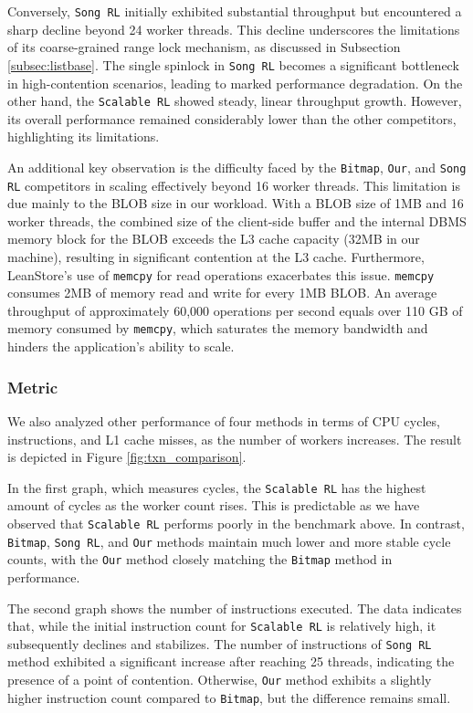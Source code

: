 Conversely, \texttt{Song RL} initially exhibited substantial throughput but encountered a sharp decline beyond 24 worker threads. 
This decline underscores the limitations of its coarse-grained range lock mechanism, as discussed in Subsection \ref{subsec:listbase}. 
The single spinlock in \texttt{Song RL} becomes a significant bottleneck in high-contention scenarios, leading to marked performance degradation. 
On the other hand, the \texttt{Scalable RL} showed steady, linear throughput growth. 
However, its overall performance remained considerably lower than the other competitors, highlighting its limitations.

An additional key observation is the difficulty faced by the \texttt{Bitmap}, \texttt{Our}, and \texttt{Song RL} competitors in scaling effectively beyond 16 worker threads. 
This limitation is due mainly to the BLOB size in our workload. With a BLOB size of 1MB and 16 worker threads, the combined size of the client-side buffer and the internal DBMS memory block for the BLOB exceeds the L3 cache capacity (32MB in our machine), resulting in significant contention at the L3 cache. 
Furthermore, LeanStore's use of \texttt{memcpy} for read operations exacerbates this issue. \texttt{memcpy} consumes 2MB of memory read and write for every 1MB BLOB. 
An average throughput of approximately 60,000 operations per second equals over 110 GB of memory consumed by \texttt{memcpy}, which saturates the memory bandwidth and hinders the application's ability to scale.

\subsubsection*{Metric}


We also analyzed other performance of four methods in terms of CPU cycles, instructions, and L1 cache misses, as the number of workers increases. The result is depicted in Figure \ref{fig:txn_comparison}. 

In the first graph, which measures cycles, the \texttt{Scalable RL} has the highest amount of cycles as the worker count rises. 
This is predictable as we have observed that \texttt{Scalable RL} performs poorly in the benchmark above. 
In contrast, \texttt{Bitmap}, \texttt{Song RL}, and \texttt{Our} methods maintain much lower and more stable cycle counts, with the \texttt{Our} method closely matching the \texttt{Bitmap} method in performance. 

The second graph shows the number of instructions executed. 
The data indicates that, while the initial instruction count for \texttt{Scalable RL} is relatively high, it subsequently declines and stabilizes. 
The number of instructions of \texttt{Song RL} method exhibited a significant increase after reaching 25 threads, indicating the presence of a point of contention.
Otherwise, \texttt{Our} method exhibits a slightly higher instruction count compared to \texttt{Bitmap}, but the difference remains small. 


